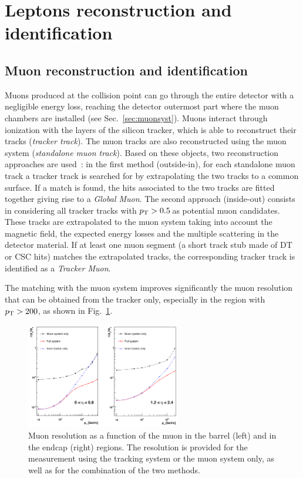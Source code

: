 \section{Leptons reconstruction and identification}\label{sec:leptonID}

\subsection{Muon reconstruction and identification}\label{sec:muID}
Muons produced at the collision point can go through the entire detector with a negligible energy loss, reaching the detector outermost part where the muon chambers are installed (see Sec.~\ref{sec:muonsyst}). Muons interact through ionization with the layers of the silicon tracker, which is able to reconstruct their tracks (\emph{tracker track}). The muon tracks are also reconstructed using the muon system (\emph{standalone muon track}). Based on these objects, two reconstruction approaches are used~\cite{Chatrchyan:2012xi}: in the first method (outside-in), for each standalone muon track a tracker track is searched for by extrapolating the two tracks to a common surface. If a match is found, the hits associated to the two tracks are fitted together giving rise to a \emph{Global Muon}. The second approach (inside-out) consists in considering all tracker tracks with $p_\mathrm{T} > 0.5$\,\GeV as potential muon candidates. These tracks are extrapolated to the muon system taking into account the magnetic field, the expected energy losses and the multiple scattering in the detector material. If at least one muon segment (a short track stub made of DT or CSC hits) matches the extrapolated tracks, the corresponding tracker track is identified as a \emph{Tracker Muon}.

The matching with the muon system improves significantly the muon \pt resolution that can be obtained from the tracker only, especially in the region with $p_\mathrm{T} > 200$\GeV, as shown in Fig.~\ref{fig:muptres}. 
\begin{figure}[htb]
\centering
\includegraphics[width=0.6\textwidth]{images/muptres.png}
\caption{Muon \pt resolution as a function of the muon \pt in the barrel (left) and in the endcap (right) regions. The resolution is provided for the measurement using the tracking system or the muon system only, as well as for the combination of the two methods.}\label{fig:muptres}
\end{figure}

